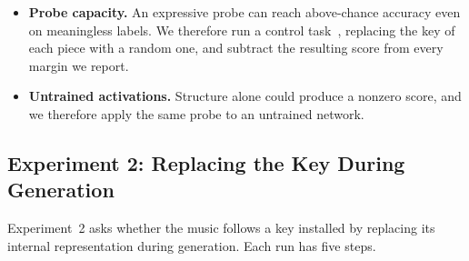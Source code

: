 \documentclass{article}
\begin{document}
\begin{itemize}
\item \textbf{Probe capacity.} An expressive probe can reach above-chance accuracy even on meaningless labels. We therefore run a control task~\cite{hewitt2019control}, replacing the key of each piece with a random one, and subtract the resulting score from every margin we report.
\item \textbf{Untrained activations.} Structure alone could produce a nonzero score, and we therefore apply the same probe to an untrained network.
\end{itemize}

\subsection{Experiment 2: Replacing the Key During Generation}
\label{sec:exp2}
Experiment~2 asks whether the music follows a key installed by replacing its internal representation during generation.
Each run has five steps.
\end{document}
